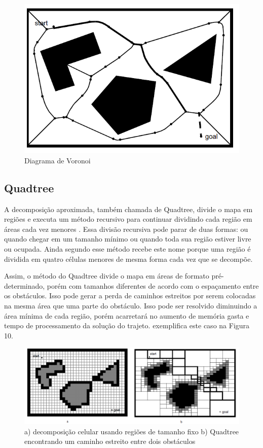 \begin{figure}[h]
	\centering
	\label{fig09}
		\includegraphics[keepaspectratio=true,scale=0.6]{figuras/8voronoi.png}
	\caption{Diagrama de Voronoi \cite{Siegwart2004}}
\end{figure}

\subsection{Quadtree}

A decomposição aproximada, também chamada de Quadtree, divide o mapa em regiões e executa um método recursivo para continuar dividindo cada região em áreas cada vez menores \cite{Thomsen2010}. Essa divisão recursiva pode parar de duas formas: ou quando chegar em um tamanho mínimo ou quando toda sua região estiver livre ou ocupada. Ainda segundo \cite{Thomsen2010} esse método recebe este nome porque uma região é dividida em quatro células menores de mesma forma cada vez que se decompõe.

Assim, o método do Quadtree divide o mapa em áreas de formato pré-determinado, porém com tamanhos diferentes de acordo com o espaçamento entre os obstáculos. Isso pode gerar a perda de caminhos estreitos por serem colocadas na mesma área que uma parte do obstáculo. Isso pode ser resolvido diminuindo a área mínima de cada região, porém acarretará no aumento de memória gasta e tempo de processamento da solução do trajeto. \cite{Siegwart2004} exemplifica este caso na Figura 10.

\begin{figure}[h]
	\centering
	\label{fig10}
		\includegraphics[keepaspectratio=true,scale=0.5]{figuras/9quadtree.png}
	\caption{ a) decomposição celular usando regiões de tamanho fixo b) Quadtree encontrando um caminho estreito entre dois obstáculos \cite{Siegwart2004}}
\end{figure}

